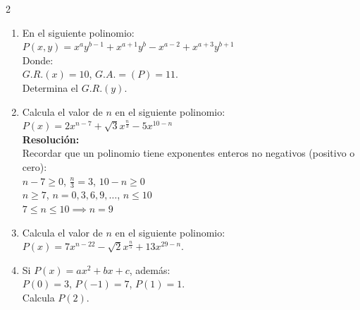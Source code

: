 \documentclass[10pt]{article}
\begin{document}
\begin{multicols}{2}
\begin{enumerate}[label=\textbf{\arabic*.}, itemsep=0.4cm]
			\item En el siguiente polinomio: \\
			$P(x, y) = x^a y^{b-1} + x^{a+1} y^b - x^{a-2} + x^{a+3} y^{b+1}$ \\
			Donde: \\
			$G.R.(x) = 10$, $G.A. = (P) = 11$. \\
			Determina el $G.R.(y)$.

			\item Calcula el valor de $n$ en el siguiente polinomio: \\
			$P(x) = 2x^{n-7} + \sqrt{3} x^{\frac{n}{3}} - 5x^{10-n}$ \\
			\textbf{Resolución:} \\
			Recordar que un polinomio tiene exponentes enteros no negativos (positivo o cero): \\
			$n - 7 \geq 0$, $\frac{n}{3} = 3$, $10 - n \geq 0$ \\
			$n \geq 7$, $n = 0, 3, 6, 9, \dots$, $n \leq 10$ \\
			$7 \leq n \leq 10 \implies \boxed{n = 9}$

			\item Calcula el valor de $n$ en el siguiente polinomio: \\
			$P(x) = 7x^{n-22} - \sqrt{2} x^{\frac{n}{5}} + 13x^{29-n}$.

			\item Si $P(x) = a x^2 + b x + c$, además: \\
			$P(0) = 3$, $P(-1) = 7$, $P(1) = 1$. \\
			Calcula $P(2)$.



		\end{enumerate}

\end{multicols}
\end{document}
